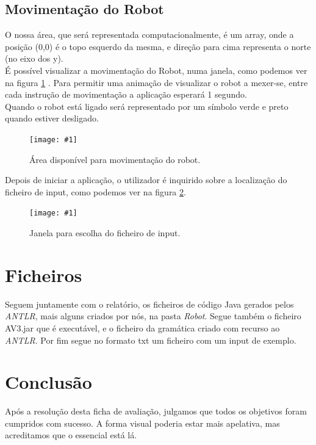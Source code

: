 \documentclass[a4paper,11pt,openright,openbib]{article}
\newcommand{\addimg}[3]{
\begin{figure}[ht!]
	\begin{center}
		\texttt{[image: \#1]}
	\end{center}	
	\caption{\label{#2}#3}
\end{figure}
}
\begin{document}
\subsection{Movimentação do Robot}
O nossa área, que será representada computacionalmente, é um array, onde a posição (0,0) é o topo esquerdo da mesma, e direção para cima representa o norte (no eixo dos y).\\
É possível visualizar a movimentação do Robot, numa janela, como podemos ver na figura \ref{tabuleiro} .  Para permitir uma animação de visualizar o robot a mexer-se, entre cada instrução de movimentação a aplicação esperará 1 segundo.\\
Quando o robot está ligado será representado por um símbolo verde e preto quando estiver desligado.
\addimg{tabuleiro.png}{tabuleiro}{Área disponível para movimentação do robot.}
Depois de iniciar a aplicação, o utilizador é inquirido sobre a localização do ficheiro de input, como podemos ver na figura \ref{file_input}.
\addimg{file_input.png}{file_input}{Janela para escolha do ficheiro de input.}

\section{Ficheiros}
Seguem juntamente com o relatório, os ficheiros de código Java gerados pelos \emph{ANTLR}, mais alguns criados por nós, na pasta \emph{Robot}. Segue também o ficheiro AV3.jar que é executável, e o ficheiro da gramática criado com recurso ao \emph{ANTLR}. Por fim segue no formato txt um ficheiro com um input de exemplo.

\section{Conclusão}
Após a resolução desta ficha de avaliação, julgamos que todos os objetivos foram cumpridos com sucesso. A forma visual poderia estar mais apelativa, mas acreditamos que o essencial está lá.
\end{document}

